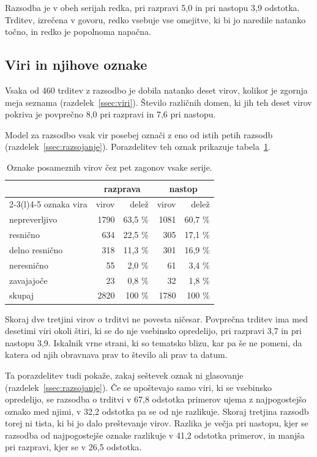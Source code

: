 \documentclass[a4paper, 12pt]{book}
\begin{document}
Razsodba  je v obeh serijah redka, pri razpravi 5,0 in pri nastopu
3,9 odstotka. Trditev, izrečena v govoru, redko vsebuje vse omejitve, ki bi jo
naredile natanko točno, in redko je popolnoma napačna.

\subsection{Viri in njihove oznake}
\label{ssec:viri-meritev}

Vsaka od 460 trditev z razsodbo je dobila natanko deset virov, kolikor je
zgornja meja seznama (razdelek~\ref{ssec:viri}).  Število
različnih domen, ki jih teh deset virov pokriva je povprečno 8,0 pri
razpravi in 7,6 pri nastopu.

Model za razsodbo vsak vir posebej označi z eno od istih petih razsodb
(razdelek~\ref{ssec:razsojanje}). Porazdelitev teh oznak prikazuje
tabela~\ref{tbl:oznake-virov}.

\begin{table}[H]
\centering
\begin{tabular}{lrrrr}
\toprule
& \multicolumn{2}{c}{razprava} & \multicolumn{2}{c}{nastop} \\
\cmidrule(lr){2-3}\cmidrule(l){4-5}
oznaka vira & virov & delež & virov & delež \\
\midrule
nepreverljivo & 1790 & 63,5 \% & 1081 & 60,7 \% \\
resnično          & 634 & 22,5 \% & 305 & 17,1 \% \\
delno resnično    & 318 & 11,3 \% & 301 & 16,9 \% \\
neresnično       & 55 & 2,0 \% & 61 & 3,4 \% \\
zavajajoče    & 23 & 0,8 \% & 32 & 1,8 \% \\
\midrule
skupaj        & 2820 & 100 \% & 1780 & 100 \% \\
\bottomrule
\end{tabular}
\caption{Oznake posameznih virov čez pet zagonov vsake serije.}
\label{tbl:oznake-virov}
\end{table}

Skoraj dve tretjini virov o trditvi ne povesta ničesar. Povprečna trditev ima
med desetimi viri okoli štiri, ki se do nje vsebinsko opredelijo, pri razpravi
3,7 in pri nastopu 3,9. Iskalnik vrne strani, ki so tematsko blizu, kar pa še ne pomeni, da katera od
njih obravnava prav to število ali prav ta datum.

Ta porazdelitev tudi pokaže, zakaj seštevek oznak ni glasovanje
(razdelek~\ref{ssec:razsojanje}). Če se upoštevajo samo viri, ki se vsebinsko
opredelijo, se razsodba o trditvi v 67,8 odstotka primerov ujema z
najpogostejšo oznako med njimi, v 32,2 odstotka pa se od nje razlikuje. Skoraj
tretjina razsodb torej ni tista, ki bi jo dalo preštevanje virov. Razlika je
večja pri nastopu, kjer se razsodba od najpogostejše oznake razlikuje v 41,2
odstotka primerov, in manjša pri razpravi, kjer se v 26,5 odstotka. 
\end{document}
